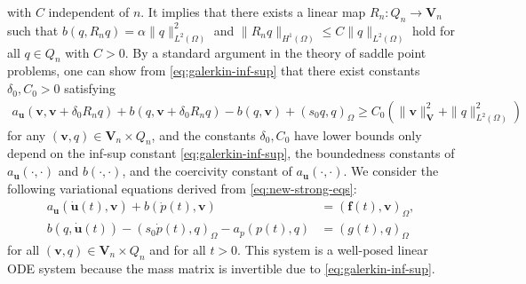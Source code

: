 \documentclass{amsart}
\begin{document}
%
with $C$ independent of $n$. 
It implies that there exists a linear map $R_n:Q_n \to \boldsymbol{V}_n$ such that $b(q, R_n q) = \alpha \|q\|_{L^2(\Omega)}^2$ and $\|R_n q\|_{H^1(\Omega)} \le C \|q\|_{L^2(\Omega)}$ hold for all $q \in Q_n$ with $C>0$. By a standard argument in the theory of saddle point problems, one can show from \eqref{eq:galerkin-inf-sup} that there exist constants $\delta_0, C_0>0$ satisfying 
%
\begin{align}
	\label{eq:Babuska-Aziz}
	a_{\boldsymbol{u}} (\boldsymbol{v}, \boldsymbol{v} + \delta_0 R_n q) + b(q,\boldsymbol{v} + \delta_0 R_n q)  - b(q,\boldsymbol{v}) + (s_0 q, q)_{\Omega} \ge C_0 (\|\boldsymbol{v}\|_{\boldsymbol{V}}^2 + \|q\|_{L^2(\Omega)}^2)
\end{align}
%
for any $(\boldsymbol{v}, q) \in \boldsymbol{V}_n \times Q_n$, and the constants $\delta_0, C_0$ have lower bounds only depend on the inf-sup constant \eqref{eq:galerkin-inf-sup}, the boundedness constants of $a_{\boldsymbol{u}}(\cdot, \cdot)$ and $b(\cdot, \cdot)$, and the coercivity constant of $a_{\boldsymbol{u}}(\cdot, \cdot)$. 
We consider the following variational equations derived from \eqref{eq:new-strong-eqs}: 
%
\begin{subequations}\label{eq:new-weak-n-eqs}
	\begin{align}
		\label{eq:new-weak-n-eq1} 
        a_{\boldsymbol{u}} (\dot{\boldsymbol{u}}(t), \boldsymbol{v}) + b(\dot{p}(t),\boldsymbol{v}) &= (\boldsymbol{f}(t), \boldsymbol{v})_{\Omega}, \\
		\label{eq:new-weak-n-eq2} 
		b(q,\dot{\boldsymbol{u}}(t)) - (s_0 \dot{p}(t), q)_{\Omega} - a_p(p(t), q) &= (g(t), q)_{\Omega}
	\end{align}
\end{subequations}
%
for all $(\boldsymbol{v}, q) \in \boldsymbol{V}_n \times Q_n$ and for all $t >0$. This system is a well-posed linear ODE system because the mass matrix is invertible due to \eqref{eq:galerkin-inf-sup}. 
\end{document}
